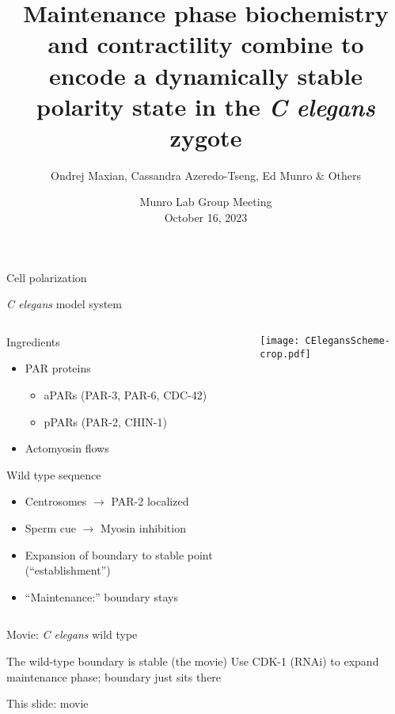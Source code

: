 \documentclass{beamer}
\title[Cell polarity dynamical system]{Maintenance phase biochemistry and contractility combine to encode a dynamically stable polarity state in the \emph{C elegans} zygote \vspace{-0.5 cm}}
\author[Ondrej Maxian, Cassandra Azeredo-Tseng, Ed Munro \& Others]{Ondrej Maxian, Cassandra Azeredo-Tseng, Ed Munro \& Others \vspace{-0.5 cm}}
\date{Munro Lab Group Meeting \\ October 16, 2023}
\newcommand{\6}[1]{#1_{\text{6}}}
\newcommand{\3}[1]{#1_{\text{3}}}
\begin{document}

\begin{frame}
  \titlepage
\vspace{-0.5 cm}
\centering
\end{frame}

\begin{frame}{Cell polarization}
\end{frame}

\begin{frame}{\emph{C elegans} model system}
\begin{columns}
\begin{column}{0.6\textwidth}
Ingredients
\begin{itemize}
\item PAR proteins 
\begin{itemize}
\item aPARs (PAR-3, PAR-6, CDC-42)
\item pPARs (PAR-2, CHIN-1)
\end{itemize}
\item Actomyosin flows 
\end{itemize}
Wild type sequence
\begin{itemize}
\item Centrosomes $\rightarrow$ PAR-2 localized
\item Sperm cue $\rightarrow$ Myosin inhibition
\item Expansion of boundary to stable point (``establishment'')
\item ``Maintenance:'' boundary stays
\end{itemize}
\end{column}

\begin{column}{0.5\textwidth}
\texttt{[image: CElegansScheme-crop.pdf]}
\end{column}
\end{columns}
\end{frame}

\begin{frame}{Movie: \emph{C elegans} wild type}
\end{frame}

\begin{frame}{The wild-type boundary is stable (the movie)}
Use CDK-1 (RNAi) to expand maintenance phase; boundary just sits there

This slide: movie

\end{frame}
\end{document}
